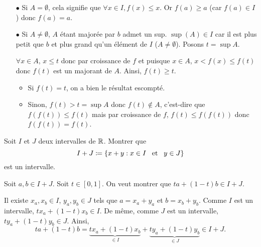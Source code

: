 \documentclass{magnolia}
\begin{document}
\begin{sol}
\begin{itemize}
\item[$\bullet$] Si $A=\emptyset$, cela signifie que $\forall x \in I, f(x)\leq x$. Or $f(a)\geq a$ (car $f(a)\in I$) donc $f(a)=a$.
\item[$\bullet$] Si $A\neq \emptyset$, $A$ étant majorée par $b$ admet un sup. $\sup(A)\in I$ car il est plus petit que $b$ et plus grand qu'un élément de $I$ ($A\neq \emptyset$). Posons $t=\sup A$.

$\forall x\in A$, $x\leq t$ donc par croissance de $f$ et puisque $x\in A$, $x<f(x)\leq f(t)$ donc $f(t)$ est un majorant de $A$. Ainsi, $f(t)\geq t$.
\begin{itemize}
\item Si $f(t)=t$, on a bien le résultat escompté.
\item Sinon, $f(t)>t=\sup A$ donc $f(t)\notin A$, c'est-dire que $f(f(t))\leq f(t)$ mais par croissance de $f$, $f(t)\leq f(f(t))$ donc $f(f(t))=f(t)$.
\end{itemize}
\end{itemize}
\end{sol}

Soit $I$ et $J$ deux intervalles de $\mathbb{R}$. Montrer que
\[I+J\coloneqq\left\{x+y : x\in I \quad\!\text{et}\quad\! y\in J\right\}\]
est un intervalle.

\begin{sol}
Soit $a,b \in I+J$. Soit $t\in [0,1]$. On veut montrer que $ta+(1-t)b \in I+J$.

Il existe $x_a,x_b \in I$, $y_a,y_b \in J$ tels que $a=x_a+y_a$ et $b=x_b+y_b$.
Comme $I$ est un intervalle, $tx_a+(1-t)x_b \in I$. De même, comme $J$ est un intervalle, $ty_a+(1-t)y_b \in J$. Ainsi,
$$ta+(1-t)b=\underbrace{tx_a+(1-t)x_b}_{\in I}+\underbrace{ty_a+(1-t)y_b}_{\in J} \in I+J.$$
\end{sol}






\end{document}
